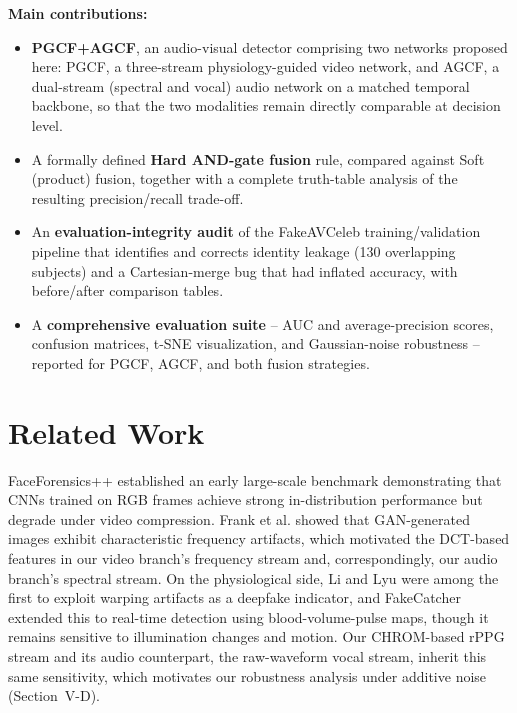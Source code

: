 \documentclass[conference]{IEEEtran}
\begin{document}
\textbf{Main contributions:}
\begin{itemize}
\setlength{\itemsep}{0pt}
\setlength{\parskip}{0pt}
\item \textbf{PGCF+AGCF}, an audio-visual detector comprising two networks proposed here: PGCF, a three-stream physiology-guided video network, and AGCF, a dual-stream (spectral and vocal) audio network on a matched temporal backbone, so that the two modalities remain directly comparable at decision level.
\item A formally defined \textbf{Hard AND-gate fusion} rule, compared against Soft (product) fusion, together with a complete truth-table analysis of the resulting precision/recall trade-off.
\item An \textbf{evaluation-integrity audit} of the FakeAVCeleb training/validation pipeline that identifies and corrects identity leakage (130 overlapping subjects) and a Cartesian-merge bug that had inflated accuracy, with before/after comparison tables.
\item A \textbf{comprehensive evaluation suite} -- AUC and average-precision scores, confusion matrices, t-SNE visualization, and Gaussian-noise robustness -- reported for PGCF, AGCF, and both fusion strategies.
\end{itemize}

\section{Related Work}

FaceForensics++ \cite{rossler2019faceforensics} established an early large-scale benchmark demonstrating that CNNs trained on RGB frames achieve strong in-distribution performance but degrade under video compression. Frank et al. \cite{frank2020frequency} showed that GAN-generated images exhibit characteristic frequency artifacts, which motivated the DCT-based features in our video branch's frequency stream and, correspondingly, our audio branch's spectral stream. On the physiological side, Li and Lyu \cite{li2019exposing} were among the first to exploit warping artifacts as a deepfake indicator, and FakeCatcher \cite{ciftci2020fakecatcher} extended this to real-time detection using blood-volume-pulse maps, though it remains sensitive to illumination changes and motion. Our CHROM-based rPPG stream and its audio counterpart, the raw-waveform vocal stream, inherit this same sensitivity, which motivates our robustness analysis under additive noise (Section~V-D).
\end{document}
